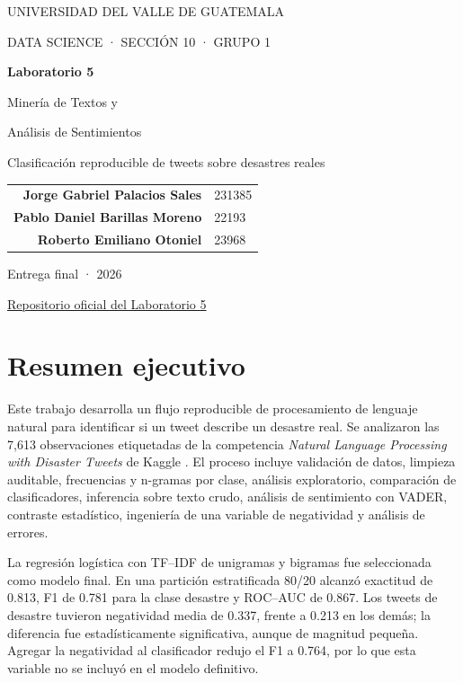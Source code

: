 \documentclass[11pt,letterpaper]{article}
\newcommand{\repo}{\href{https://github.com/DanielBarillasM/Laboratorio-5.-Mineria-de-Textos-y-Analisis-de-Sentimientos_Grupo-1_DS_Sec-10}{Repositorio oficial del Laboratorio 5}}
\begin{document}
\begin{titlepage}
\pagecolor{navy}
\color{white}
\centering
\vspace*{1.8cm}
{\small UNIVERSIDAD DEL VALLE DE GUATEMALA\par}
\vspace{0.35cm}
{\small DATA SCIENCE · SECCIÓN 10 · GRUPO 1\par}
\vfill
{\Huge\bfseries Laboratorio 5\par}
\vspace{0.4cm}
{\LARGE Minería de Textos y\par Análisis de Sentimientos\par}
\vspace{0.8cm}
{\large Clasificación reproducible de tweets sobre desastres reales\par}
\vfill
\begin{tabular}{rl}
\textbf{Jorge Gabriel Palacios Sales} & 231385\\
\textbf{Pablo Daniel Barillas Moreno} & 22193\\
\textbf{Roberto Emiliano Otoniel} & 23968\\
\end{tabular}
\vfill
{\large Entrega final · 2026\par}
\vspace{0.5cm}
{\small \repo\par}
\end{titlepage}
\nopagecolor
\color{black}

\tableofcontents
\newpage

\section{Resumen ejecutivo}

Este trabajo desarrolla un flujo reproducible de procesamiento de lenguaje natural para identificar si un tweet describe un desastre real. Se analizaron las 7,613 observaciones etiquetadas de la competencia \emph{Natural Language Processing with Disaster Tweets} de Kaggle \cite{kaggle}. El proceso incluye validación de datos, limpieza auditable, frecuencias y n-gramas por clase, análisis exploratorio, comparación de clasificadores, inferencia sobre texto crudo, análisis de sentimiento con VADER, contraste estadístico, ingeniería de una variable de negatividad y análisis de errores.

La regresión logística con TF--IDF de unigramas y bigramas fue seleccionada como modelo final. En una partición estratificada 80/20 alcanzó exactitud de 0.813, F1 de 0.781 para la clase desastre y ROC--AUC de 0.867. Los tweets de desastre tuvieron negatividad media de 0.337, frente a 0.213 en los demás; la diferencia fue estadísticamente significativa, aunque de magnitud pequeña. Agregar la negatividad al clasificador redujo el F1 a 0.764, por lo que esta variable no se incluyó en el modelo definitivo.
\end{document}
